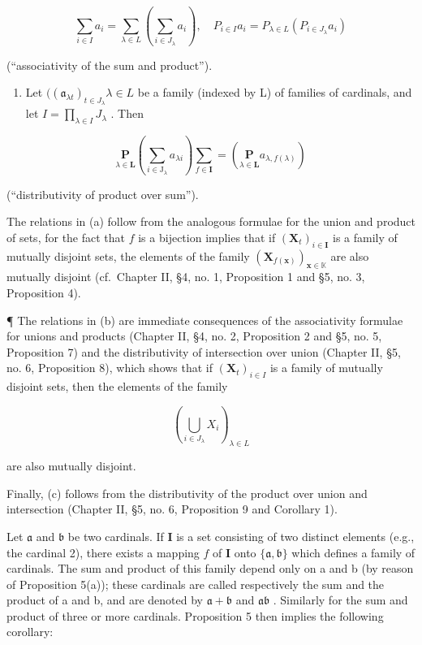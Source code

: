 \[
\sum_ {i \in I} a _ {i} = \sum_ {\lambda \in L} \left(\sum_ {i \in J _ {\lambda}} a _ {i}\right), \quad P _ {i \in I} a _ {i} = P _ {\lambda \in L} \left(P _ {i \in J _ {\lambda}} a _ {i}\right)
\]

(``associativity of the sum and product'').

\begin{enumerate}
\def\labelenumi{(\alph{enumi})}
\setcounter{enumi}{2}
\tightlist
\item
  Let \(((\mathfrak{a}_{\lambda t})_{t\in J_{\lambda}}\lambda \in L\) be a family (indexed by L) of families of cardinals, and let \(I = \prod_{\lambda \in I}J_{\lambda}\) . Then
\end{enumerate}

\[
\underset {\lambda \in \mathbf {L}} {\mathbf {P}} \left(\sum_ {i \in \mathrm{J} _ {\lambda}} a _ {\lambda i}\right) \underset {f \in \mathbf {I}} {\sum} = \left(\underset {\lambda \in \mathbf {L}} {\mathbf {P}} a _ {\lambda , f (\lambda)}\right)
\]

(``distributivity of product over sum'').

The relations in (a) follow from the analogous formulae for the union and product of sets, for the fact that \(f\) is a bijection implies that if \((\mathbf{X}_t)_{i \in \mathbf{I}}\) is a family of mutually disjoint sets, the elements of the family \((\mathbf{X}_{f(\mathbf{x})})_{\mathbf{x} \in \mathbb{K}}\) are also mutually disjoint (cf.~Chapter II, §4, no. 1, Proposition 1 and §5, no. 3, Proposition 4).

¶ The relations in (b) are immediate consequences of the associativity formulae for unions and products (Chapter II, §4, no. 2, Proposition 2 and §5, no. 5, Proposition 7) and the distributivity of intersection over union (Chapter II, §5, no. 6, Proposition 8), which shows that if \((\mathbf{X}_{t})_{i\in I}\) is a family of mutually disjoint sets, then the elements of the family

\[
\left(\bigcup_ {i \in J _ {\lambda}} X _ {i}\right) _ {\lambda \in L}
\]

are also mutually disjoint.

Finally, (c) follows from the distributivity of the product over union and intersection (Chapter II, §5, no. 6, Proposition 9 and Corollary 1).

Let \(\mathfrak{a}\) and \(\mathfrak{b}\) be two cardinals. If \(\mathbf{I}\) is a set consisting of two distinct elements (e.g., the cardinal 2), there exists a mapping \(f\) of \(\mathbf{I}\) onto \(\{\mathfrak{a}, \mathfrak{b}\}\) which defines a family of cardinals. The sum and product of this family depend only on a and b (by reason of Proposition 5(a)); these cardinals are called respectively the sum and the product of a and b, and are denoted by \(\mathfrak{a} + \mathfrak{b}\) and \(\mathfrak{a}\mathfrak{b}\) . Similarly for the sum and product of three or more cardinals. Proposition 5 then implies the following corollary:


